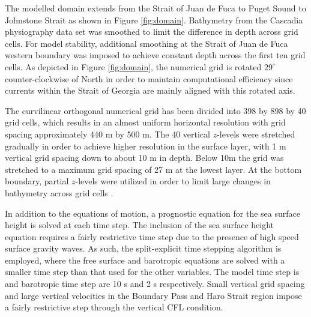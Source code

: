 \documentclass[pdftex,10pt]{article}
\begin{document}
The modelled domain extends from the Strait of Juan de Fuca to Puget Sound to Johnstone Strait as shown in Figure \ref{fig:domain}. Bathymetry from the Cascadia physiography data set \citep{haugerud1999digital} was smoothed to limit the difference in depth across grid cells. For model stability, additional smoothing at the Strait of Juan de Fuca western boundary was imposed to achieve constant depth across the first ten grid cells. As depicted in Figure \ref{fig:domain}, the numerical grid is rotated $29^{\circ}$ counter-clockwise of North in order to maintain computational efficiency since currents within the Strait of Georgia are mainly aligned with this rotated axis. 

The curvilinear orthogonal numerical grid has been divided into 398 by 898 by 40 grid cells, which results in an almost uniform horizontal resolution with grid spacing approximately 440 m by 500 m. The 40 vertical $z$-levels were stretched gradually in order to achieve higher resolution in the surface layer, with 1 m vertical grid spacing down to about 10 m in depth. Below 10m the grid was stretched to a maximum grid spacing of 27 m at the lowest layer. At the bottom boundary, partial $z$-levels were utilized in order to limit large changes in bathymetry across grid cells \citep{madec2012nemo}. 

In addition to the equations of motion, a prognostic equation for the sea surface height is solved at each time step. The inclusion of the sea surface height equation requires a fairly restrictive time step due to the presence of high speed surface gravity waves. As such, the split-explicit time stepping algorithm is employed, where the free surface and barotropic equations are solved with a smaller time step than that used for the other variables. The model time step is and barotropic time step are 10 s and 2 s respectively. Small vertical grid spacing and large vertical velocities in the Boundary Pass and Haro Strait region impose a fairly restrictive step through the vertical CFL condition.
\end{document}
